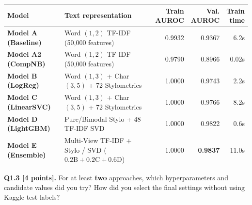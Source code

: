 \documentclass[11pt,letterpaper]{article}
\begin{document}
\vspace{3pt}
{\small
\renewcommand{\arraystretch}{1.20}
\begin{tabularx}{\textwidth}{@{}l >{\raggedright\arraybackslash}X rrr@{}}
\toprule
\textbf{Model} & \textbf{Text representation} & \shortstack{\textbf{Train}\\\textbf{AUROC}} & \shortstack{\textbf{Val.}\\\textbf{AUROC}} & \shortstack{\textbf{Train}\\\textbf{time}} \\
\midrule
\textbf{Model A (Baseline)} & Word $(1,2)$ TF-IDF (50,000 features) & 0.9932 & 0.9367 & 6.2s \\
\textbf{Model A2 (CompNB)} & Word $(1,2)$ TF-IDF (50,000 features) & 0.9790 & 0.8966 & 0.02s \\
\textbf{Model B (LogReg)} & Word $(1,3)$ + Char $(3,5)$ + 72 Stylometrics & 1.0000 & 0.9743 & 2.2s \\
\textbf{Model C (LinearSVC)} & Word $(1,3)$ + Char $(3,5)$ + 72 Stylometrics & 1.0000 & 0.9766 & 8.2s \\
\textbf{Model D (LightGBM)} & 72 Pure/Bimodal Stylo + 48 TF-IDF SVD & 1.0000 & 0.9822 & 0.6s \\
\textbf{Model E (Ensemble)} & Multi-View TF-IDF + Stylo / SVD ($0.2\text{B} + 0.2\text{C} + 0.6\text{D}$) & 1.0000 & \textbf{0.9837} & 11.0s \\
\bottomrule
\end{tabularx}
}

\newpage

\textbf{Q1.3 [4 points].} For at least \textbf{two} approaches, which hyperparameters and candidate values did you try? How did you select the final settings without using Kaggle test labels?
\end{document}
